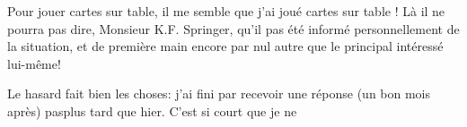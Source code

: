 Pour jouer cartes sur table, il me semble que j'ai joué cartes sur table ! Là il ne pourra pas dire, Monsieur K.F. Springer, qu'il  pas été informé personnellement de la situation, et de première main encore\inserted{,} par nul autre que le principal intéressé lui-même!

Le hasard fait bien les choses: j'ai  fini par recevoir une réponse (un bon mois après) pas\inserted{\unsure{,}}plus tard que hier. C'est si court que je ne
